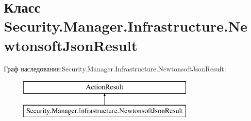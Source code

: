 \hypertarget{class_security_1_1_manager_1_1_infrastructure_1_1_newtonsoft_json_result}{}\section{Класс Security.\+Manager.\+Infrastructure.\+Newtonsoft\+Json\+Result}
\label{class_security_1_1_manager_1_1_infrastructure_1_1_newtonsoft_json_result}
Граф наследования\+:Security.\+Manager.\+Infrastructure.\+Newtonsoft\+Json\+Result\+:\begin{figure}[H]
\begin{center}
\leavevmode
\includegraphics[height=2.000000cm]{d6/d95/class_security_1_1_manager_1_1_infrastructure_1_1_newtonsoft_json_result}
\end{center}
\end{figure}
